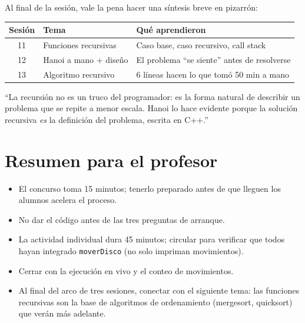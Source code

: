 \documentclass[12pt, oneside]{article}
\begin{document}
Al final de la sesión, vale la pena hacer una síntesis breve en pizarrón:

\begin{center}
\begin{tabular}{cll}
  \toprule
  \textbf{Sesión} & \textbf{Tema} & \textbf{Qué aprendieron} \\
  \midrule
  11 & Funciones recursivas   & Caso base, caso recursivo, call stack \\
  12 & Hanoi a mano + diseño  & El problema ``se siente'' antes de resolverse \\
  13 & Algoritmo recursivo    & 6 líneas hacen lo que tomó 50 min a mano \\
  \bottomrule
\end{tabular}
\end{center}

\begin{notaprofesor}
  ``La recursión no es un truco del programador: es la forma natural de
  describir un problema que se repite a menor escala.  Hanoi lo hace
  evidente porque la solución recursiva \textit{es} la definición del
  problema, escrita en C++.''
\end{notaprofesor}

\section{Resumen para el profesor}

\begin{recuerda}
\begin{itemize}
  \item El concurso toma 15 minutos; tenerlo preparado antes de que lleguen
        los alumnos acelera el proceso.
  \item No dar el código antes de las tres preguntas de arranque.
  \item La actividad individual dura 45 minutos; circular para verificar que
        todos hayan integrado \texttt{moverDisco} (no solo impriman movimientos).
  \item Cerrar con la ejecución en vivo y el conteo de movimientos.
  \item Al final del arco de tres sesiones, conectar con el siguiente tema:
        las funciones recursivas son la base de algoritmos de ordenamiento
        (mergesort, quicksort) que verán más adelante.
\end{itemize}
\end{recuerda}
\end{document}
